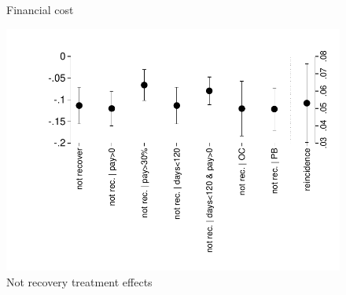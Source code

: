 \documentclass[11pt]{article}
\begin{document}
\begin{figure}[H]
    \caption{Financial cost}
    \label{det_naiveness}
    \begin{center}
        \caption{Not recovery treatment effects}
        \centering
        \includegraphics[width=\textwidth]{Figuras/def_te.pdf}
    \end{center}
\end{figure}
\end{document}
